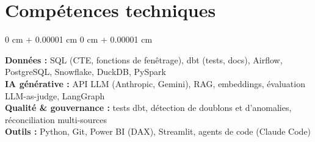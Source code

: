 \documentclass[10pt, letterpaper]{article}
\newenvironment{onecolentry}{
    \begin{adjustwidth}{
        0 cm + 0.00001 cm
    }{
        0 cm + 0.00001 cm
    }
}{
    \end{adjustwidth}
} %
\begin{document}
    \section{Compétences techniques}
        \begin{onecolentry}
        \textbf{Données :} SQL (CTE, fonctions de fenêtrage), dbt (tests, docs), Airflow, PostgreSQL, Snowflake, DuckDB, PySpark \\
        \textbf{IA générative :} API LLM (Anthropic, Gemini), RAG, embeddings, évaluation LLM-as-judge, LangGraph \\
        \textbf{Qualité \& gouvernance :} tests dbt, détection de doublons et d'anomalies, réconciliation multi-sources \\
        \textbf{Outils :} Python, Git, Power BI (DAX), Streamlit, agents de code (Claude Code)
        \end{onecolentry}

        \vspace{0.2 cm}
\end{document}
